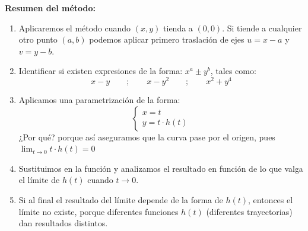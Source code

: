 {\Large\textbf{Resumen del método:}}
\begin{enumerate}[label=\roman*.]
    \item Aplicaremos el método cuando $(x,y)$ tienda a $(0,0)$. Si tiende a cualquier otro punto $(a,b)$ podemos aplicar primero traslación de ejes $u=x-a$ y $v=y-b$.
    \item Identificar si existen expresiones de la forma: $x^a \pm y^b$, tales como:
\[
x-y \qquad ; \qquad x-y^2 \qquad ; \qquad x^2 + y^4
\]
    \item Aplicamos una parametrización de la forma:
    $$\begin{cases} x = t \\ y = t \cdot h(t) \end{cases}$$
    ¿Por qué? porque así aseguramos que la curva pase por el origen, pues $\lim_{t \to 0} t \cdot h(t)=0$
    \item Sustituimos en la función y analizamos el resultado en función de lo que valga el límite de $h(t)$ cuando $t \to 0$.
    \item Si al final el resultado del límite depende de la forma de $h(t)$, entonces el límite no existe, porque diferentes funciones $h(t)$ (diferentes trayectorias) dan resultados distintos.
\end{enumerate}

